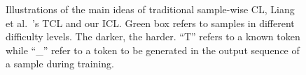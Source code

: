 \begin{figure}[th]
	\centering
	\begin{minipage}[t]{0.33\linewidth}
		\centering
	\end{minipage}%
	\begin{minipage}[t]{0.33\linewidth}
		\centering
	\end{minipage}%
	\begin{minipage}[t]{0.33\linewidth}
		\centering
	\end{minipage}%
	\centering
	\caption{Illustrations of the main ideas of traditional sample-wise CL, Liang et al.~'s TCL and our ICL. 
Green box refers to samples in different difficulty levels. The darker, the harder. ``T'' refers to a known token while ``\_'' refer to a token to be
generated in the output sequence of a sample during training.}
	\label{fig:intro}
\end{figure}


